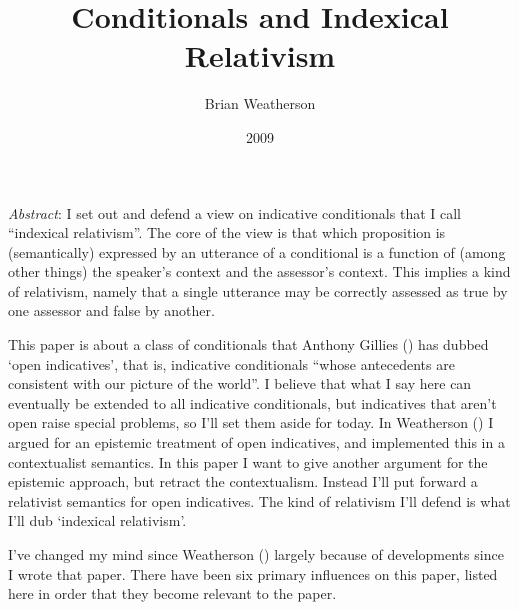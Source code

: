 \documentclass[
  11pt,
  letterpaper,
  DIV=11,
  numbers=noendperiod,
  twoside]{scrartcl}
\title{Conditionals and Indexical Relativism}
\author{Brian Weatherson}
\date{2009}
\renewenvironment{abstract}
 {\vspace{-1.25cm}
 \quotation\small\noindent\emph{Abstract}:}
 {\endquotation}
\begin{document}
\maketitle
\begin{abstract}
I set out and defend a view on indicative conditionals that I call
``indexical relativism''. The core of the view is that which proposition
is (semantically) expressed by an utterance of a conditional is a
function of (among other things) the speaker's context and the
assessor's context. This implies a kind of relativism, namely that a
single utterance may be correctly assessed as true by one assessor and
false by another.
\end{abstract}


This paper is about a class of conditionals that Anthony Gillies
() has dubbed `open indicatives',
that is, indicative conditionals ``whose antecedents are consistent with
our picture of the world''. I believe that what I say here can
eventually be extended to all indicative conditionals, but indicatives
that aren't open raise special problems, so I'll set them aside for
today. In Weatherson () I
argued for an epistemic treatment of open indicatives, and implemented
this in a contextualist semantics. In this paper I want to give another
argument for the epistemic approach, but retract the contextualism.
Instead I'll put forward a relativist semantics for open indicatives.
The kind of relativism I'll defend is what I'll dub `indexical
relativism'.

I've changed my mind since Weatherson
() largely because of
developments since I wrote that paper. There have been six primary
influences on this paper, listed here in order that they become relevant
to the paper.
\end{document}
